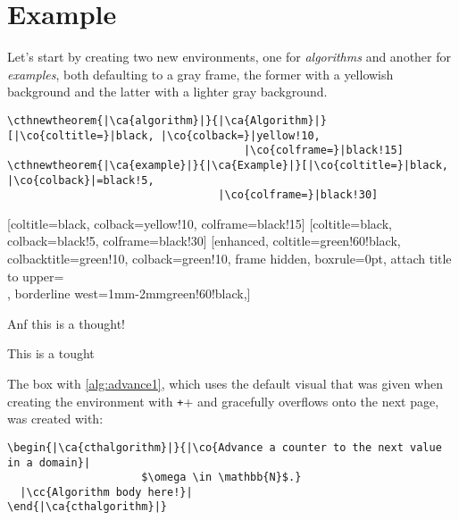\documentclass{article}
\begin{document}
\section{Example}
\label{sec:examples}

Let's start by creating two new environments, one for \emph{algorithms} and another for \emph{examples}, both defaulting to a gray frame, the former with a yellowish background and the latter with a lighter gray background.

\begin{verbatim}
\cthnewtheorem{|\ca{algorithm}|}{|\ca{Algorithm}|}[|\co{coltitle=}|black, |\co{colback=}|yellow!10,
                                     |\co{colframe=}|black!15]
\cthnewtheorem{|\ca{example}|}{|\ca{Example}|}[|\co{coltitle=}|black, |\co{colback}|=black!5,
                                 |\co{colframe=}|black!30]  
\end{verbatim}

[coltitle=black, colback=yellow!10, colframe=black!15]
[coltitle=black, colback=black!5, colframe=black!30]
[enhanced, coltitle=green!60!black, colbacktitle=green!10, colback=green!10, frame hidden, boxrule=0pt, attach title to upper={\\[0.5ex]}, borderline west={1mm}{-2mm}{green!60!black},]

Anf this is a thought!
\begin{cththought}{This is a tought}
\kant[2]
\end{cththought}

The box with \autoref{alg:advance1}, which uses the default visual that was given when creating the environment with \texttt+\cthnewtheorem+ and gracefully overflows onto the next page, was created with:
\begin{verbatim}
\begin{|\ca{cthalgorithm}|}{|\co{Advance a counter to the next value in a domain}|
                     $\omega \in \mathbb{N}$.}
  |\cc{Algorithm body here!}|
\end{|\ca{cthalgorithm}|}
\end{verbatim}

\newcommand{\bracesemptyset}{\ensuremath{\lbrace\,\rbrace}}
\end{document}
